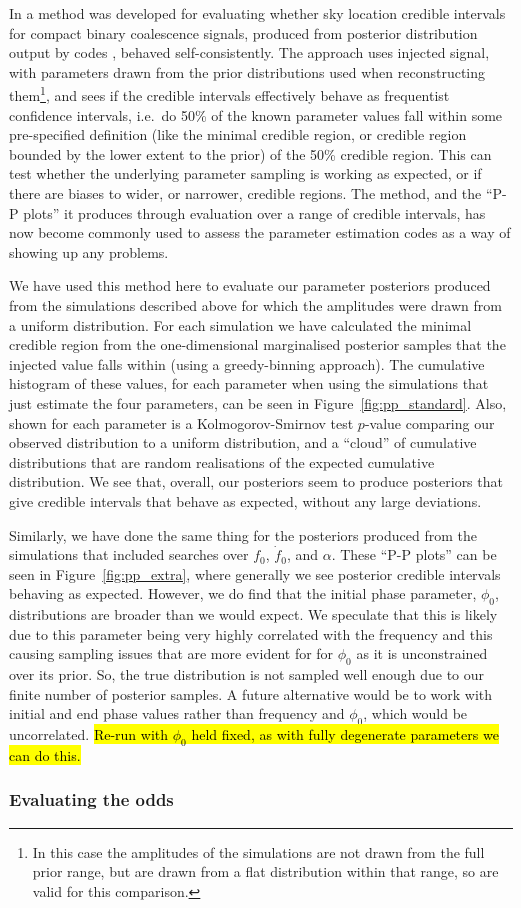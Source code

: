 In \citet{2014PhRvD..89h4060S} a method was developed for evaluating whether sky location credible intervals for compact binary coalescence \gw signals, produced
from posterior distribution output by \lalinf codes \citep{2015PhRvD..91d2003V}, behaved self-consistently. The approach uses injected signal, with parameters
drawn from the prior distributions used when reconstructing them\footnote{In this case the amplitudes of the simulations are not drawn from the full prior range,
but are drawn from a flat distribution within that range, so are valid for this comparison.}, and sees if the credible intervals effectively behave as frequentist
confidence intervals, i.e.\ do 50\% of the known parameter values fall within some pre-specified definition (like the minimal credible region, or credible
region bounded by the lower extent to the prior) of the 50\% credible region. This can test whether the underlying \lalinf parameter sampling is working as
expected, or if there are biases to wider, or narrower, credible regions. The method, and the ``P-P plots'' it produces through evaluation over a range of credible
intervals, has now become commonly used to assess the \lalinf parameter estimation codes \citep{2015PhRvD..91d2003V} as a way of showing up any problems.

We have used this method here to evaluate our parameter posteriors produced from the simulations described above for which the amplitudes were drawn from
a uniform distribution. For each simulation we have calculated the minimal credible region from the one-dimensional marginalised posterior samples that the
injected value falls within (using a greedy-binning approach). The cumulative histogram of these values, for each parameter when using the simulations that
just estimate the four \gw parameters, can be seen in Figure~\ref{fig:pp_standard}. Also, shown for each parameter is a Kolmogorov-Smirnov test $p$-value
comparing our observed distribution to a uniform distribution, and a ``cloud'' of cumulative distributions that are random realisations of the expected
cumulative distribution. We see that, overall, our posteriors seem to produce posteriors that give credible intervals that behave as expected, without any
large deviations.

Similarly, we have done the same thing for the posteriors produced from the simulations that included searches over $f_0$, $\dot{f}_0$, and $\alpha$. These
``P-P plots'' can be seen in Figure~\ref{fig:pp_extra}, where generally we see posterior credible intervals behaving as expected. However, we do find that the
initial phase parameter, $\phi_0$, distributions are broader than we would expect. We speculate that this is likely due to this parameter being very highly
correlated with the frequency and this causing sampling issues that are more evident for for $\phi_0$ as it is unconstrained over its prior. So, the true
distribution is not sampled well enough due to our finite number of posterior samples. A future alternative would be to work with initial and end phase values
rather than frequency and $\phi_0$, which would be uncorrelated. \hl{Re-run with $\phi_0$ held fixed, as with fully degenerate parameters we can do this.}

\subsubsection{Evaluating the odds}\label{sec:evalodds}
